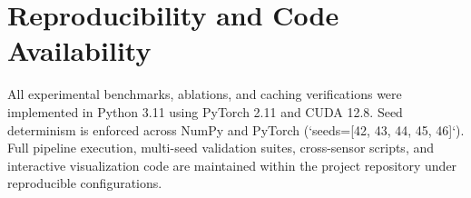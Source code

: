\documentclass[conference,letterpaper]{IEEEtran}
\begin{document}
\section*{Reproducibility and Code Availability}
All experimental benchmarks, ablations, and caching verifications were implemented in Python 3.11 using PyTorch 2.11 and CUDA 12.8. Seed determinism is enforced across NumPy and PyTorch (`seeds=[42, 43, 44, 45, 46]`). Full pipeline execution, multi-seed validation suites, cross-sensor scripts, and interactive visualization code are maintained within the project repository under reproducible configurations.



\end{document}
